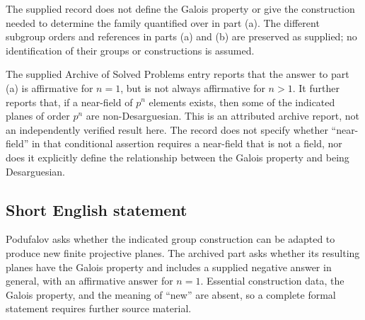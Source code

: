\documentclass[11pt]{article}
\begin{document}
The supplied record does not define the Galois property or give the construction needed to determine the family quantified over in part (a). The different subgroup orders and references in parts (a) and (b) are preserved as supplied; no identification of their groups or constructions is assumed.

The supplied Archive of Solved Problems entry reports that the answer to part (a) is affirmative for \(n=1\), but is not always affirmative for \(n>1\). It further reports that, if a near-field of \(p^n\) elements exists, then some of the indicated planes of order \(p^n\) are non-Desarguesian. This is an attributed archive report, not an independently verified result here. The record does not specify whether ``near-field'' in that conditional assertion requires a near-field that is not a field, nor does it explicitly define the relationship between the Galois property and being Desarguesian.
\subsection{Short English statement}
Podufalov asks whether the indicated group construction can be adapted to produce new finite projective planes. The archived part asks whether its resulting planes have the Galois property and includes a supplied negative answer in general, with an affirmative answer for \(n=1\). Essential construction data, the Galois property, and the meaning of ``new'' are absent, so a complete formal statement requires further source material.
\end{document}

